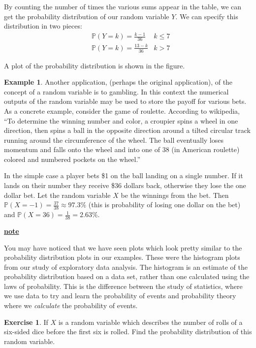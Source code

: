 \documentclass[
]{book}
\newcommand{\prob}[1]{{\mathbb{P}(#1)}}
\newenvironment{rmdblock}[1]
  {\begin{shaded*}
  \centerline{\underline{\textbf{#1}}}

  }
  {
  \end{shaded*}
  }
\newenvironment{note}
  {\begin{rmdblock}{note}}
  {\end{rmdblock}}
\theoremstyle{definition}
\theoremstyle{definition}
\newtheorem{example}{Example}[chapter]
\theoremstyle{definition}
\newtheorem{exercise}{Exercise}[chapter]
\theoremstyle{definition}
\theoremstyle{remark}
\begin{document}
By counting the number of times the various sums appear in the table, we can get the probability distribution of our random variable \(Y\). We can specify this distribution in two pieces:
\[
\begin{aligned}
& \prob{Y=k}=\frac{k-1}{36} & k \leq 7 \\
& \prob{Y=k}=\frac{13-k}{36} & k>7  
\end{aligned}
\]

A plot of the probability distribution is shown in the figure.

\begin{example}
\protect\hypertarget{exm:unnamed-chunk-256}{}\label{exm:unnamed-chunk-256}Another application, (perhaps the original application), of the concept of a random variable is to gambling. In this context the numerical outputs of the random variable may be used to store the payoff for various bets. As a concrete example, consider the game of roulette. According to wikipedia, ``To determine the winning number and color, a croupier spins a wheel in one direction, then spins a ball in the opposite direction around a tilted circular track running around the circumference of the wheel. The ball eventually loses momentum and falls onto the wheel and into one of 38 (in American roulette) colored and numbered pockets on the wheel.''

In the simple case a player bets \$1 on the ball landing on a single number. If it lands on their number they receive \$36 dollars back, otherwise they lose the one dollar bet. Let the random variable \(X\) be the winnings from the bet. Then \(\prob{X=-1}=\frac{37}{38}\approx 97.3\%\) (this is probability of losing one dollar on the bet) and \(\prob{X=36}=\frac{1}{38}=2.63\%\).
\end{example}

\begin{note}
You may have noticed that we have seen plots which look pretty similar to the probability distribution plots in our examples. These were the histogram plots from our study of exploratory data analysis. The histogram is an estimate of the probability distribution based on a data set, rather than one calculated using the laws of probability. This is the difference between the study of statistics, where we use data to try and learn the probability of events and probability theory where we \emph{calculate} the probability of events.
\end{note}

\begin{exercise}
\protect\hypertarget{exr:unnamed-chunk-258}{}\label{exr:unnamed-chunk-258}If \(X\) is a random variable which describes the number of rolls of a six-sided dice before the first six is rolled. Find the probability distribution of this random variable.
\end{exercise}
\end{document}
